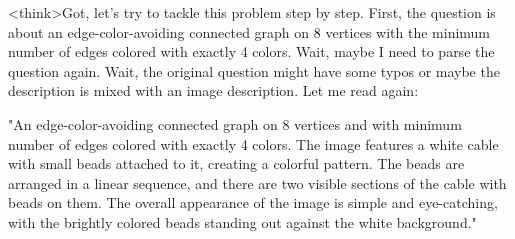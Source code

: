<think>Got, let's try to tackle this problem step by step. First, the question is about an edge-color-avoiding connected graph on 8 vertices with the minimum number of edges colored with exactly 4 colors. Wait, maybe I need to parse the question again. Wait, the original question might have some typos or maybe the description is mixed with an image description. Let me read again:

"An edge-color-avoiding connected graph on 8 vertices and with minimum number of edges colored with exactly 4 colors. The image features a white cable with small beads attached to it, creating a colorful pattern. The beads are arranged in a linear sequence, and there are two visible sections of the cable with beads on them. The overall appearance of the image is simple and eye-catching, with the brightly colored beads standing out against the white background."

